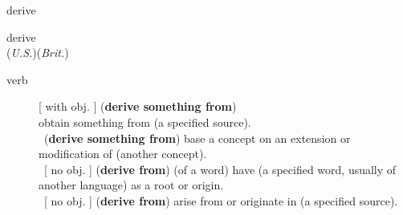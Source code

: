 \documentclass[avery5372, grid]{flashcards}
\begin{document}
\begin{flashcard}{\Huge derive}
	\begin{center}
		{\LARGE de\textbullet rive}\\
		(\textit{U.S.})\hspace{0.25cm}(\textit{Brit.})
	\end{center}
	\begin{description}
		
		\item[verb] [ with obj. ] (\textbf{derive something from})\\
			
			obtain something from (a specified source).\\%
			\textbullet\ (\textbf{derive something from}) base a concept on an extension or modification of (another concept).\\%
			\textbullet\ [ no obj. ] (\textbf{derive from}) (of a word) have (a specified word, usually of another language) as a root or origin.\\%
			\textbullet\ [ no obj. ] (\textbf{derive from}) arise from or originate in (a specified source).\\%
			

\end{description}
\end{flashcard}
\end{document}
